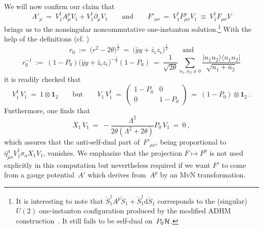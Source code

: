 \documentclass[a4paper,11pt]{article}
\numberwithin{equation}{section}
\def\eps{\epsilon}
\def\th{\theta}
\newcommand{\Hcal}{{\cal H}}
\def\pa{\mbox{$\partial$}}
\def\diff{\mbox{d}}
\def\>{\rangle}
\def\<{\langle}
\def\+{\dagger}
\begin{document}
{We will now confirm our claim that 
\begin{equation} \label{A'}
A'_\mu\ =\ V^\+_1 A^p_\mu V_1 + V^\+_1\pa_\mu V_1 
\qquad\textrm{and}\qquad
F'_{\mu\nu}\ =\ V^\+_1 F_{\mu\nu}^p V_1\ \equiv\ V^\+_1 F_{\mu\nu} V
\end{equation}
brings us to the nonsingular noncommutative one-instanton solution.\footnote{
It is interesting to note that 
$\check S_1^\+ A^p \check S_1+\check S_1^\+ \diff\check S_1$
corresponds to the (singular) $U(2)$ one-instanton configuration produced 
by the modified ADHM construction~\cite{Furuuchi:2001vx}.
It still fails to be self-dual on~$P_0\Hcal$.}
With the help of the definitions (cf. \cite{Furuuchi:2001vx})
$$
r_0\ :=\ \bigl( r^2 -2\th \bigr)^\frac{1}{2}\ =\
\bigl(\bar yy + \bar z_\eps z_\eps \bigr)^\frac{1}{2}\qquad\textrm{and} 
$$
\begin{equation}
r_0^{-1}\ :=\ 
(1{-}P_0)\bigl( \bar yy + \bar z_\eps z_\eps \bigr)^{-\frac12}(1{-}P_0)\ =\
\frac{1}{\sqrt{2\th}}\sum_{n_1,n_2\ne 0}
\frac{|n_1n_2\>\<n_1n_2|}{\sqrt{n_1{+}n_2}}
\end{equation}
it is readily checked that
\begin{equation} \label{nonunitary}
V^\+_1\,V_1\ =\ 1\otimes {\mathbf 1}_2 \qquad\textrm{but}\qquad
V_1\,V^\+_1\ =\ \begin{pmatrix}1{-}P_0&0\\0&1{-}P_0\end{pmatrix}\ =\
(1-P_0)\otimes {\mathbf 1}_2\ .
\end{equation}
{}Furthermore, one finds that
\begin{equation}
X_1\,V_1\ =\ -\frac{\Lambda^2}{2\th(\Lambda^2+2\th )}P_0\,V_1\ =\ 0\ ,
\end{equation}
which assures that
the anti-self-dual part of~$F'_{\mu\nu}$, being proportional to 
$\bar\eta^a_{\mu\nu}V_1^\+\sigma_a X_1 V_1$,
vanishes. We emphasize that the projection $F\mapsto F^p$ is 
not used explicitly in this computation but nevertheless required 
if we want $F'$ to come from a gauge potential~$A'$ which derives 
from~$A^p$ by an MvN transformation.

}
\end{document}
